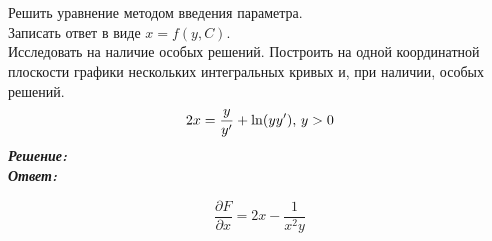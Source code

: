 \documentclass[a5paper, 10pt]{article}
\theoremstyle{definition}
\theoremstyle{plain}
\theoremstyle{remark}
\begin{document}
\newpage
\section{}
Решить уравнение методом введения параметра. \\
Записать ответ в виде $x = f(y, C)$.\\
Исследовать на наличие особых решений. Построить на одной координатной плоскости графики нескольких интегральных кривых и, при наличии, особых решений.
\begin{equation*}
2x = \frac{y}{y'} + \ln (yy'), \, y >0\\
\end{equation*}
\textit{\textbf{Решение:}}\\


\textit{\textbf{Ответ:}}


\begin{equation*}
\frac{\partial F}{\partial x} =  2x - \frac{1}{x^2y}
\end{equation*}
\end{document}
